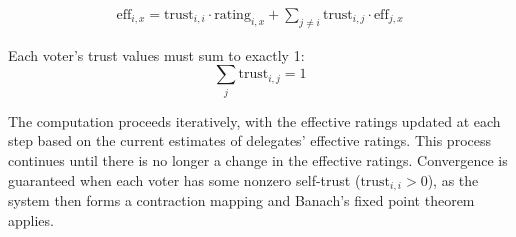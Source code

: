 \begin{gather}
  \text{eff}_{i,x} = \text{trust}_{i,i} \cdot \text{rating}_{i,x} + \sum_{j \neq i} \text{trust}_{i,j} \cdot \text{eff}_{j,x}
\end{gather}

Each voter's trust values must sum to exactly 1:
\[
\sum_{j} \text{trust}_{i,j} = 1
\]

The computation proceeds iteratively, with the effective ratings updated at each step based on the current estimates of delegates' effective ratings. This process continues until there is no longer a change in the effective ratings. Convergence is guaranteed when each voter has some nonzero self-trust (\( \text{trust}_{i,i} > 0 \)), as the system then forms a contraction mapping and Banach's fixed point theorem applies.







